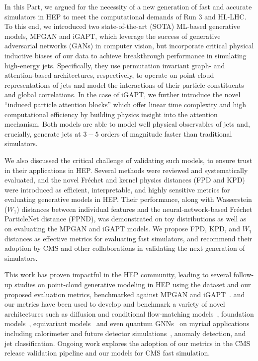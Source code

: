 In this Part, we argued for the necessity of a new generation of fast and accurate simulators in HEP to meet the computational demands of Run 3 and HL-LHC.
To this end, we introduced two state-of-the-art (SOTA) ML-based generative models, MPGAN and iGAPT, which leverage the success of generative adversarial networks (GANs) in computer vision, but incorporate critical physical inductive biases of our data to achieve breakthrough performance in simulating high-energy jets.
Specifically, they use permutation invariant graph- and attention-based architectures, respectively, to operate on point cloud representations of jets and model the interactions of their particle constituents and global correlations.
In the case of iGAPT, we further introduce the novel ``induced particle attention blocks'' which offer linear time complexity and high computational efficiency by building physics insight into the attention mechanism.
Both models are able to model well physical observables of jets and, crucially, generate jets at $3-5$ orders of magnitude faster than traditional simulators.

We also discussed the critical challenge of validating such models, to ensure trust in their applications in HEP.
Several methods were reviewed and systematically evaluated, and the novel Fr\'echet and kernel physics distances (FPD and KPD) were introduced as efficient, interpretable, and highly sensitive metrics for evaluating generative models in HEP.
Their performance, along with Wasserstein ($W_1$) distances between individual features and the neural-network-based Fr\'echet ParticleNet distance (FPND), was demonstrated on toy distributions as well as on evaluating the MPGAN and iGAPT models. 
We propose FPD, KPD, and $W_1$ distances as effective metrics for evaluating fast simulators, and recommend their adoption by CMS and other collaborations in validating the next generation of simulators.

This work has proven impactful in the HEP community, leading to several follow-up studies on point-cloud generative modeling in HEP using the \jetnet dataset and our proposed evaluation metrics, benchmarked against MPGAN and iGAPT~\cite{Kach:2022qnf, Kach:2022uzq, Buhmann:2023pmh, Leigh:2023toe, Mikuni:2023dvk, Kach:2023rqw, Leigh:2023zle, Scham:2023cwn, Scham:2023usu, Buhmann:2023zgc, Jiang:2024ohg}.
\jetnet and our metrics have been used to develop and benchmark a variety of novel architectures such as diffusion and conditional flow-matching models~\cite{Mikuni:2023dvk, Buhmann:2023zgc, Jiang:2024ohg, Jiang:2024bwr}, foundation models~\cite{Mikuni:2024qsr}, equivariant models~\cite{Hao:2022zns} and even quantum GNNs~\cite{Chen:2024rna} on myriad applications including calorimeter and future detector simulations~\cite{Krause:2024avx, Araz:2024bom}, anomaly detection, and jet classification.
Ongoing work explores the adoption of our metrics in the CMS release validation pipeline and our models for CMS fast simulation.